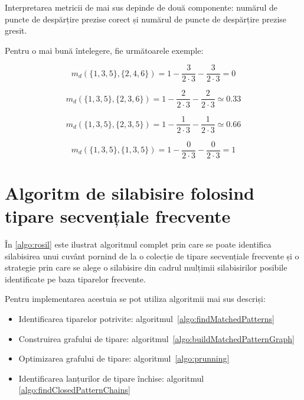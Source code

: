 Interpretarea metricii de mai sus depinde de două componente: numărul de puncte de despărțire prezise corect și numărul de puncte de despărțire prezise gresit.

\begin{ex}
Pentru o mai bună întelegere, fie următoarele exemple:

\begin{equation}
m_d(\{1,3,5\}, \{2,4,6\}) = 1- \frac{3}{2 \cdot 3} - \frac{3}{2 \cdot 3} = 0 
\end{equation}

\begin{equation}
m_d(\{1,3,5\}, \{2,3,6\}) = 1- \frac{2}{2 \cdot 3} - \frac{2}{2 \cdot 3} \simeq 0.33 
\end{equation}

\begin{equation}
m_d(\{1,3,5\}, \{2,3,5\}) = 1- \frac{1}{2 \cdot 3} - \frac{1}{2 \cdot 3} \simeq 0.66 
\end{equation}


\begin{equation}
m_d(\{1,3,5\}, \{1,3,5\}) = 1 - \frac{0}{2 \cdot 3} - \frac{0}{2 \cdot 3} = 1 
\end{equation}


\end{ex} 

\section{Algoritm de silabisire folosind tipare secvențiale frecvente}
În \ref{algo:rosil} este ilustrat algoritmul complet prin care se poate identifica silabisirea unui cuvânt pornind de la o colecție de tipare secvențiale frecvente și o strategie prin care se alege o silabisire din cadrul mulțimii silabisirilor posibile identificate pe baza tiparelor frecvente.

Pentru implementarea acestuia se pot utiliza algoritmii mai sus descriși:

\begin{itemize}
\item Identificarea tiparelor potrivite: algoritmul~\ref{algo:findMatchedPatterns}
\item Construirea grafului de tipare: algoritmul~\ref{algo:buildMatchedPatternGraph}
\item Optimizarea grafului de tipare: algoritmul~\ref{algo:prunning}
\item Identificarea lanțurilor de tipare închise: algoritmul~ \ref{algo:findClosedPatternChains}
\end{itemize}


